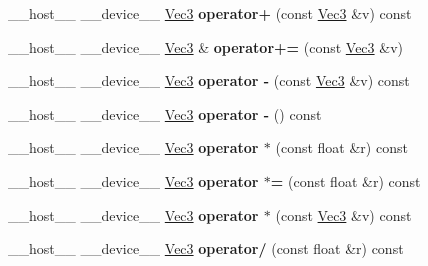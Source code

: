 \begin{DoxyCompactItemize}
\item 
\+\_\+\+\_\+host\+\_\+\+\_\+ \+\_\+\+\_\+device\+\_\+\+\_\+ \hyperlink{class_vec3}{Vec3} {\bfseries operator+} (const \hyperlink{class_vec3}{Vec3} \&v) const\hypertarget{class_vec3_aa60e8d896fff309c4b0ee1435b6e00bb}{}\label{class_vec3_aa60e8d896fff309c4b0ee1435b6e00bb}

\item 
\+\_\+\+\_\+host\+\_\+\+\_\+ \+\_\+\+\_\+device\+\_\+\+\_\+ \hyperlink{class_vec3}{Vec3} \& {\bfseries operator+=} (const \hyperlink{class_vec3}{Vec3} \&v)\hypertarget{class_vec3_a6f4e538fda1288a1c650407dcaa2e4ad}{}\label{class_vec3_a6f4e538fda1288a1c650407dcaa2e4ad}

\item 
\+\_\+\+\_\+host\+\_\+\+\_\+ \+\_\+\+\_\+device\+\_\+\+\_\+ \hyperlink{class_vec3}{Vec3} {\bfseries operator -\/} (const \hyperlink{class_vec3}{Vec3} \&v) const\hypertarget{class_vec3_aca45728410c7fa3cfc10168e41ab4649}{}\label{class_vec3_aca45728410c7fa3cfc10168e41ab4649}

\item 
\+\_\+\+\_\+host\+\_\+\+\_\+ \+\_\+\+\_\+device\+\_\+\+\_\+ \hyperlink{class_vec3}{Vec3} {\bfseries operator -\/} () const\hypertarget{class_vec3_ab8ef4a52f843e1381c3f22c6cd61fcc9}{}\label{class_vec3_ab8ef4a52f843e1381c3f22c6cd61fcc9}

\item 
\+\_\+\+\_\+host\+\_\+\+\_\+ \+\_\+\+\_\+device\+\_\+\+\_\+ \hyperlink{class_vec3}{Vec3} {\bfseries operator $\ast$} (const float \&r) const\hypertarget{class_vec3_a0fd3d63acd5e4ebbe2f8dda2825869fc}{}\label{class_vec3_a0fd3d63acd5e4ebbe2f8dda2825869fc}

\item 
\+\_\+\+\_\+host\+\_\+\+\_\+ \+\_\+\+\_\+device\+\_\+\+\_\+ \hyperlink{class_vec3}{Vec3} {\bfseries operator $\ast$=} (const float \&r) const\hypertarget{class_vec3_aaa0e591b69a2cf5d585e9d048d0c20f4}{}\label{class_vec3_aaa0e591b69a2cf5d585e9d048d0c20f4}

\item 
\+\_\+\+\_\+host\+\_\+\+\_\+ \+\_\+\+\_\+device\+\_\+\+\_\+ \hyperlink{class_vec3}{Vec3} {\bfseries operator $\ast$} (const \hyperlink{class_vec3}{Vec3} \&v) const\hypertarget{class_vec3_a2f1d4dcb982ffdc48e9c87d4d8a7655f}{}\label{class_vec3_a2f1d4dcb982ffdc48e9c87d4d8a7655f}

\item 
\+\_\+\+\_\+host\+\_\+\+\_\+ \+\_\+\+\_\+device\+\_\+\+\_\+ \hyperlink{class_vec3}{Vec3} {\bfseries operator/} (const float \&r) const\hypertarget{class_vec3_a9b66d38d3386efcfca935e2a90a95aa6}{}\label{class_vec3_a9b66d38d3386efcfca935e2a90a95aa6}


\end{DoxyCompactItemize}
